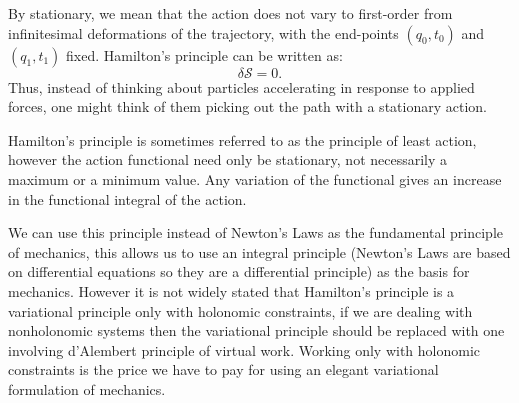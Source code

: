 \documentclass{article}
\begin{document}
 By stationary, we mean that the action does not vary to first-order from infinitesimal deformations of the trajectory, with the end-points $(q_0, t_0)$ and $(q_1,t_1)$ fixed. Hamilton's principle can be written as: %
 $$\delta \mathcal{S} = 0. $$
 Thus, instead of thinking about particles accelerating in response to applied forces, one might think of them picking out the path with a stationary action.

 Hamilton's principle is sometimes referred to as the principle of least action, however the action functional need only be stationary, not necessarily a maximum or a minimum value. Any variation of the functional gives an increase in the functional integral of the action.

 We can use this principle instead of Newton's Laws as the fundamental principle of mechanics, this allows us to use an integral principle (Newton's Laws are based on differential equations so they are a differential principle) as the basis for mechanics. However it is not widely stated that Hamilton's principle is a variational principle only with holonomic constraints, if we are dealing with nonholonomic systems then the variational principle should be replaced with one involving d'Alembert principle of virtual work. Working only with holonomic constraints is the price we have to pay for using an elegant variational formulation of mechanics.
\end{document}
